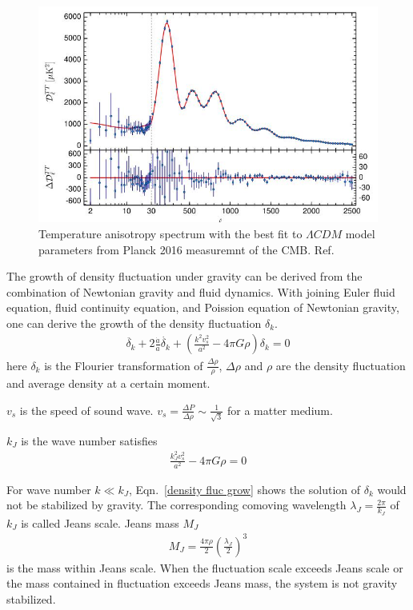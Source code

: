 \begin{figure}[htb]
	\centering
	\includegraphics[width=\figurewidth,clip,trim={0 0 0 0},angle=0,origin=c]{Figures/Intro/CMBSpectrumTT.jpg}
	\caption[Temperature anisotropy spectrum of Cosmic Microwave Background]{Temperature anisotropy spectrum with the best fit to $\Lambda CDM$ model parameters from Planck 2016 measuremnt of the CMB. Ref.~\cite{Ade2016}}
	\label{fig:CMBSpectrum}
\end{figure}

The growth of density fluctuation under gravity can be derived from the combination of Newtonian gravity and fluid dynamics. With joining Euler fluid equation, fluid continuity equation, and Poission equation of Newtonian gravity, one can derive the growth of the density fluctuation $\delta_k$. 
\begin{align}
\label{density fluc grow}
\ddot{\delta_k} + 2 \frac{\dot{a}}{a} \dot{\delta_k} + (\frac{k^2 v_s^2}{a^2}-4 \pi G \rho) \delta_k = 0
\end{align}
here $\delta_k$ is the Flourier transformation of $\frac{\Delta \rho}{\rho}$, $\Delta \rho$ and $\rho$ are the density fluctuation and average density at a certain moment. 

$v_s$ is the speed of sound wave. $v_s = \frac{\Delta P}{\Delta \rho} \sim \frac{1}{\sqrt{3}} $ for a matter medium.

$k_J$ is the wave number satisfies
\begin{align}
\frac{k_J^2 v_s^2}{a^2}-4 \pi G \rho = 0  
\end{align}

For wave number $k \ll k_J$, Eqn.~\ref{density fluc grow} shows the solution of $\delta_k$ would not be stabilized by gravity. The corresponding comoving wavelength $\lambda_J = \frac{2 \pi}{k_J}$ of $k_J$ is called Jeans scale. Jeans mass $M_J$
\begin{align}
M_J = \frac{4 \pi \rho}{2} (\frac{\lambda_J}{2})^3
\end{align}
is the mass within Jeans scale. When the fluctuation scale exceeds Jeans scale or the mass contained in fluctuation exceeds Jeans mass, the system is not gravity stabilized.

